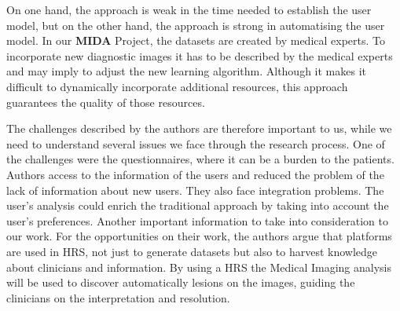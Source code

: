 On one hand, the approach is weak in the time needed to establish the user model, but on the other hand, the approach is strong in automatising the user model. In our \textbf{MIDA} Project, the datasets are created by medical experts. To incorporate new diagnostic images it has to be described by the medical experts and may imply to adjust the new learning algorithm. Although it makes it difficult to dynamically incorporate additional resources, this approach guarantees the quality of those resources.

The challenges described by the authors are therefore important to us, while we need to understand several issues we face through the research process. One of the challenges were the questionnaires, where it can be a burden to the patients. Authors access to the information of the users and reduced the problem of the lack of information about new users. They also face integration problems. The user’s analysis could enrich the traditional approach by taking into account the user's preferences. Another important information to take into consideration to our work. For the opportunities on their work,  the authors argue that platforms are used in HRS, not just to generate datasets but also to harvest knowledge about clinicians and information. By using a HRS the Medical Imaging analysis will be used to discover automatically lesions on the images, guiding the clinicians on the interpretation and resolution.